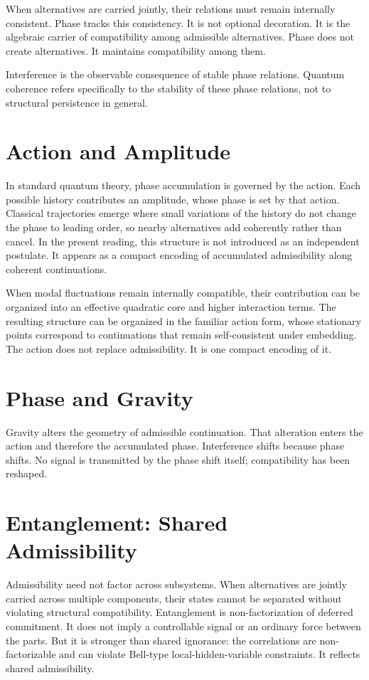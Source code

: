 \documentclass[11pt,twoside,openright]{book}
\begin{document}
When alternatives are carried jointly, their relations must remain internally consistent. Phase tracks this consistency. It is not optional decoration. It is the algebraic carrier of compatibility among admissible alternatives. Phase does not create alternatives. It maintains compatibility among them.

Interference is the observable consequence of stable phase relations. Quantum coherence refers specifically to the stability of these phase relations, not to structural persistence in general.

\section*{Action and Amplitude}

In standard quantum theory, phase accumulation is governed by the action. Each possible history contributes an amplitude, whose phase is set by that action. Classical trajectories emerge where small variations of the history do not change the phase to leading order, so nearby alternatives add coherently rather than cancel. In the present reading, this structure is not introduced as an independent postulate. It appears as a compact encoding of accumulated admissibility along coherent continuations.

When modal fluctuations remain internally compatible, their contribution can be organized into an effective quadratic core and higher interaction terms. The resulting structure can be organized in the familiar action form, whose stationary points correspond to continuations that remain self-consistent under embedding. The action does not replace admissibility. It is one compact encoding of it.

\section*{Phase and Gravity}

Gravity alters the geometry of admissible continuation. That alteration enters the action and therefore the accumulated phase. Interference shifts because phase shifts. No signal is transmitted by the phase shift itself; compatibility has been reshaped.

\section*{Entanglement: Shared Admissibility}

Admissibility need not factor across subsystems. When alternatives are jointly carried across multiple components, their states cannot be separated without violating structural compatibility. Entanglement is non-factorization of deferred commitment. It does not imply a controllable signal or an ordinary force between the parts. But it is stronger than shared ignorance: the correlations are non-factorizable and can violate Bell-type local-hidden-variable constraints. It reflects shared admissibility.
\end{document}
